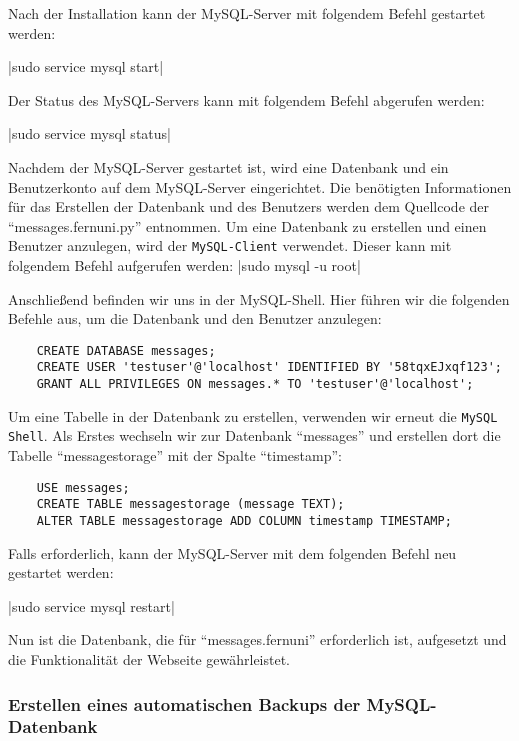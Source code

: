 Nach der Installation kann der MySQL-Server mit folgendem Befehl gestartet werden:

|sudo service mysql start|

Der Status des MySQL-Servers kann mit folgendem Befehl abgerufen werden:

|sudo service mysql status|

Nachdem der MySQL-Server gestartet ist, wird eine Datenbank und ein Benutzerkonto auf dem MySQL-Server eingerichtet. Die benötigten Informationen für das Erstellen der Datenbank und des Benutzers werden dem Quellcode der \enquote{messages.fernuni.py} entnommen.
Um eine Datenbank zu erstellen und einen Benutzer anzulegen, wird der \verb+MySQL-Client+ verwendet. Dieser kann mit folgendem Befehl aufgerufen werden:
|sudo mysql -u root|

Anschließend befinden wir uns in der MySQL-Shell. Hier führen wir die folgenden Befehle aus, um die Datenbank und den Benutzer anzulegen:

\begin{verbatim}
    CREATE DATABASE messages;
    CREATE USER 'testuser'@'localhost' IDENTIFIED BY '58tqxEJxqf123';
    GRANT ALL PRIVILEGES ON messages.* TO 'testuser'@'localhost';
\end{verbatim}

Um eine Tabelle in der Datenbank zu erstellen, verwenden wir erneut die \verb+MySQL Shell+.
Als Erstes wechseln wir zur Datenbank \enquote{messages} und erstellen dort die Tabelle \enquote{messagestorage} mit der Spalte \enquote{timestamp}:

\begin{verbatim}
    USE messages;
    CREATE TABLE messagestorage (message TEXT);
    ALTER TABLE messagestorage ADD COLUMN timestamp TIMESTAMP;
\end{verbatim}

Falls erforderlich, kann der MySQL-Server mit dem folgenden Befehl neu gestartet werden:

|sudo service mysql restart|

Nun ist die Datenbank, die für \enquote{messages.fernuni} erforderlich ist, aufgesetzt und die Funktionalität der Webseite gewährleistet.

\subsubsection*{Erstellen eines automatischen Backups der MySQL-Datenbank}

